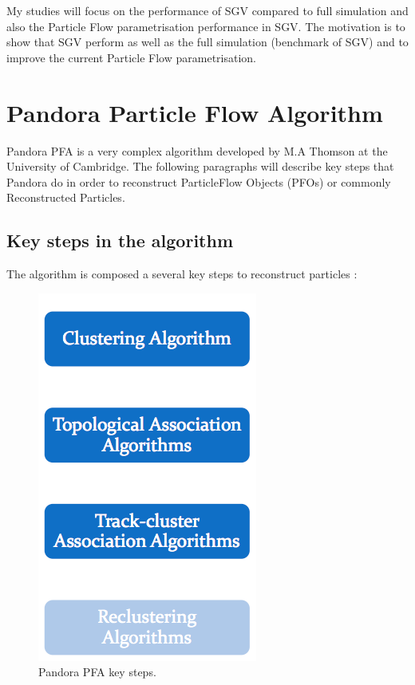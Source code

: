 \documentclass[a4paper,12pt]{article}
\begin{document}
My studies will focus on the performance of SGV compared to full simulation and also the Particle Flow parametrisation performance in SGV. The motivation is to show that SGV perform as well as the full simulation (benchmark of SGV) and to improve the current Particle Flow parametrisation. 

\section{Pandora Particle Flow Algorithm}

Pandora PFA is a very complex algorithm developed by M.A Thomson at the University of Cambridge. The following paragraphs will describe key steps that Pandora do in order to reconstruct ParticleFlow Objects (PFOs) or commonly Reconstructed Particles. 

\subsection{Key steps in the algorithm}

The algorithm is composed a several key steps to reconstruct particles \cite{Pandora}:

\begin{figure}[H]
\centering
   \includegraphics[scale=0.3]{steps.png} 
      \caption{Pandora PFA key steps.}
   \label{fig:pflow_step}
\end{figure}
\end{document}

